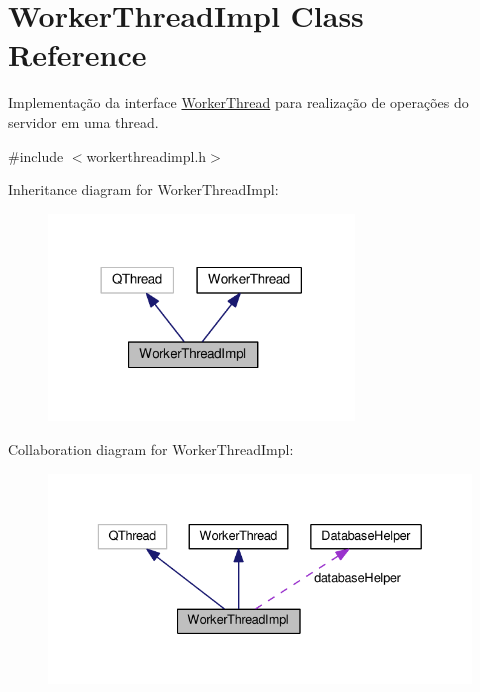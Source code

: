 \hypertarget{classWorkerThreadImpl}{}\section{Worker\+Thread\+Impl Class Reference}
\label{classWorkerThreadImpl}


Implementação da interface \hyperlink{classWorkerThread}{Worker\+Thread} para realização de operações do servidor em uma thread.  




{\ttfamily \#include $<$workerthreadimpl.\+h$>$}



Inheritance diagram for Worker\+Thread\+Impl\+:
\nopagebreak
\begin{figure}[H]
\begin{center}
\leavevmode
\includegraphics[width=230pt]{d6/d44/classWorkerThreadImpl__inherit__graph}
\end{center}
\end{figure}


Collaboration diagram for Worker\+Thread\+Impl\+:
\nopagebreak
\begin{figure}[H]
\begin{center}
\leavevmode
\includegraphics[width=336pt]{de/d29/classWorkerThreadImpl__coll__graph}
\end{center}
\end{figure}
